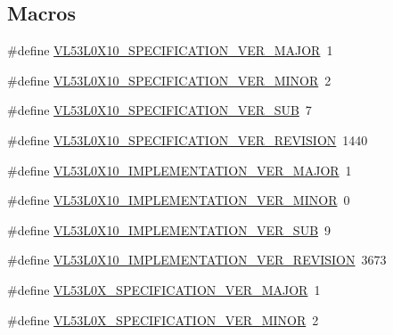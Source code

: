 \subsection*{Macros}
\begin{DoxyCompactItemize}
\item 
\#define \hyperlink{group__VL53L0X__globaldefine__group_ga4436dba3d980a0aa455ac8d349d0548f}{V\+L53\+L0\+X10\+\_\+\+S\+P\+E\+C\+I\+F\+I\+C\+A\+T\+I\+O\+N\+\_\+\+V\+E\+R\+\_\+\+M\+A\+J\+OR}~1
\item 
\#define \hyperlink{group__VL53L0X__globaldefine__group_ga165ca09869a75a47af2c86dded92b2ff}{V\+L53\+L0\+X10\+\_\+\+S\+P\+E\+C\+I\+F\+I\+C\+A\+T\+I\+O\+N\+\_\+\+V\+E\+R\+\_\+\+M\+I\+N\+OR}~2
\item 
\#define \hyperlink{group__VL53L0X__globaldefine__group_gafcd69daf7d710455aa2f8125fb344b01}{V\+L53\+L0\+X10\+\_\+\+S\+P\+E\+C\+I\+F\+I\+C\+A\+T\+I\+O\+N\+\_\+\+V\+E\+R\+\_\+\+S\+UB}~7
\item 
\#define \hyperlink{group__VL53L0X__globaldefine__group_gaea570701997c26f8b7a52ba087f30478}{V\+L53\+L0\+X10\+\_\+\+S\+P\+E\+C\+I\+F\+I\+C\+A\+T\+I\+O\+N\+\_\+\+V\+E\+R\+\_\+\+R\+E\+V\+I\+S\+I\+ON}~1440
\item 
\#define \hyperlink{group__VL53L0X__globaldefine__group_ga00b3a9035c263c946cd344a005806e92}{V\+L53\+L0\+X10\+\_\+\+I\+M\+P\+L\+E\+M\+E\+N\+T\+A\+T\+I\+O\+N\+\_\+\+V\+E\+R\+\_\+\+M\+A\+J\+OR}~1
\item 
\#define \hyperlink{group__VL53L0X__globaldefine__group_ga4c31059c86c862f2b04033b8697e3bed}{V\+L53\+L0\+X10\+\_\+\+I\+M\+P\+L\+E\+M\+E\+N\+T\+A\+T\+I\+O\+N\+\_\+\+V\+E\+R\+\_\+\+M\+I\+N\+OR}~0
\item 
\#define \hyperlink{group__VL53L0X__globaldefine__group_gac50191a106c06fb02b9bc6b2649e8849}{V\+L53\+L0\+X10\+\_\+\+I\+M\+P\+L\+E\+M\+E\+N\+T\+A\+T\+I\+O\+N\+\_\+\+V\+E\+R\+\_\+\+S\+UB}~9
\item 
\#define \hyperlink{group__VL53L0X__globaldefine__group_gab2794b874c1d325aa4ab8594a0ec9229}{V\+L53\+L0\+X10\+\_\+\+I\+M\+P\+L\+E\+M\+E\+N\+T\+A\+T\+I\+O\+N\+\_\+\+V\+E\+R\+\_\+\+R\+E\+V\+I\+S\+I\+ON}~3673
\item 
\#define \hyperlink{group__VL53L0X__globaldefine__group_ga95f0ac7233e5b18464f683bc55684094}{V\+L53\+L0\+X\+\_\+\+S\+P\+E\+C\+I\+F\+I\+C\+A\+T\+I\+O\+N\+\_\+\+V\+E\+R\+\_\+\+M\+A\+J\+OR}~1
\item 
\#define \hyperlink{group__VL53L0X__globaldefine__group_ga5000c528311a08322528b02f6d96fec3}{V\+L53\+L0\+X\+\_\+\+S\+P\+E\+C\+I\+F\+I\+C\+A\+T\+I\+O\+N\+\_\+\+V\+E\+R\+\_\+\+M\+I\+N\+OR}~2

\end{DoxyCompactItemize}
